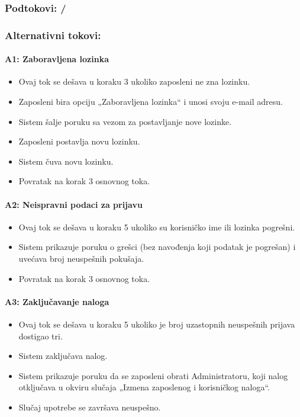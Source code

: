 \subsubsection*{Podtokovi: /}

\subsubsection*{Alternativni tokovi:}

\paragraph*{A1: Zaboravljena lozinka}
\begin{itemize}
	\item Ovaj tok se dešava u koraku 3 ukoliko zaposleni ne zna lozinku.
	\item Zaposleni bira opciju „Zaboravljena lozinka“ i unosi svoju e-mail adresu.
	\item Sistem šalje poruku sa vezom za postavljanje nove lozinke.
	\item Zaposleni postavlja novu lozinku.
	\item Sistem čuva novu lozinku.
	\item Povratak na korak 3 osnovnog toka.
\end{itemize}

\paragraph*{A2: Neispravni podaci za prijavu}
\begin{itemize}
	\item Ovaj tok se dešava u koraku 5 ukoliko su korisničko ime ili lozinka pogrešni.
	\item Sistem prikazuje poruku o grešci (bez navođenja koji podatak je pogrešan) i uvećava broj neuspešnih pokušaja.
	\item Povratak na korak 3 osnovnog toka.
\end{itemize}

\paragraph*{A3: Zaključavanje naloga}
\begin{itemize}
	\item Ovaj tok se dešava u koraku 5 ukoliko je broj uzastopnih neuspešnih prijava dostigao tri.
	\item Sistem zaključava nalog.
	\item Sistem prikazuje poruku da se zaposleni obrati Administratoru, koji nalog otključava u okviru slučaja „Izmena zaposlenog i korisničkog naloga“.
	\item Slučaj upotrebe se završava neuspešno.
\end{itemize}

